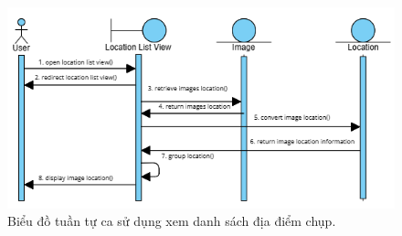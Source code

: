 \begin{figure}[H]
    \centering  
    \includegraphics[width=1\textwidth]{figures/c3/3-3-13-sequence-diagram.png}
    \caption{Biểu đồ tuần tự ca sử dụng xem danh sách địa điểm chụp.}
    \label{fig:3-3-13-sequence-diagram}
\end{figure}